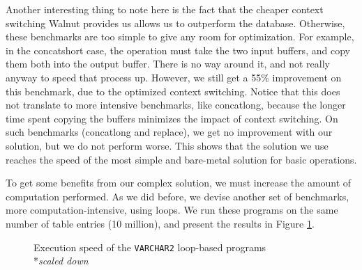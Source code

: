 \documentclass[twoside,11pt,a4paper]{article}
\newcommand{\pls}[1]{\small\texttt{#1}\normalsize}
\newcommand{\plstype}[1]{\pls{#1}}
\newcommand{\varchar}{\plstype{VARCHAR2}}
\newcommand{\bench}[1]{\textsf{#1}}
\begin{document}
Another interesting thing to note here is the fact that the cheaper context switching Walnut provides us allows us to outperform the database. Otherwise, these benchmarks are too simple to give any room for optimization. For example, in the \bench{concatshort} case, the operation must take the two input buffers, and copy them both into the output buffer. There is no way around it, and not really anyway to speed that process up. However, we still get a 55\% improvement on this benchmark, due to the optimized context switching. Notice that this does not translate to more intensive benchmarks, like \bench{concatlong}, because the longer time spent copying the buffers minimizes the impact of context switching. On such benchmarks (\bench{concatlong} and \bench{replace}), we get no improvement with our solution, but we do not perform worse. This shows that the solution we use reaches the speed of the most simple and bare-metal solution for basic operations.

To get some benefits from our complex solution, we must increase the amount of computation performed. As we did before, we devise another set of benchmarks, more computation-intensive, using loops. We run these programs on the same number of table entries (10 million), and present the results in Figure \ref{fig:exp3b}.

\begin{figure}[tp]
	\centering
	\caption[Execution speed of the \varchar{} loop-based programs]{Execution speed of the \varchar{} loop-based programs\\
			\hspace*{-4cm}*\textit{scaled down}}
	\label{fig:exp3b}
\end{figure}
\end{document}
